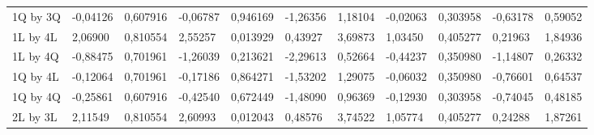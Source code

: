 \begin{table}[H]
{\begin{tabular}{lllllllllll}
\rowcolor[HTML]{FFFFFF} 
{\color[HTML]{000000} 1Q by 3Q}       & {\color[HTML]{000000} -0,04126} & {\color[HTML]{000000} 0,607916} & {\color[HTML]{000000} -0,06787} & {\color[HTML]{000000} 0,946169} & {\color[HTML]{000000} -1,26356}       & {\color[HTML]{000000} 1,18104}        & {\color[HTML]{000000} -0,02063} & {\color[HTML]{000000} 0,303958}      & {\color[HTML]{000000} -0,63178}       & {\color[HTML]{000000} 0,59052}        \\
\rowcolor[HTML]{FFFFFF} 
{\color[HTML]{000000} 1L by 4L}       & {\color[HTML]{FF0000} 2,06900}  & {\color[HTML]{FF0000} 0,810554} & {\color[HTML]{FF0000} 2,55257}  & {\color[HTML]{FF0000} 0,013929} & {\color[HTML]{FF0000} 0,43927}        & {\color[HTML]{FF0000} 3,69873}        & {\color[HTML]{FF0000} 1,03450}  & {\color[HTML]{FF0000} 0,405277}      & {\color[HTML]{FF0000} 0,21963}        & {\color[HTML]{FF0000} 1,84936}        \\
\rowcolor[HTML]{FFFFFF} 
{\color[HTML]{000000} 1L by 4Q}       & {\color[HTML]{000000} -0,88475} & {\color[HTML]{000000} 0,701961} & {\color[HTML]{000000} -1,26039} & {\color[HTML]{000000} 0,213621} & {\color[HTML]{000000} -2,29613}       & {\color[HTML]{000000} 0,52664}        & {\color[HTML]{000000} -0,44237} & {\color[HTML]{000000} 0,350980}      & {\color[HTML]{000000} -1,14807}       & {\color[HTML]{000000} 0,26332}        \\
\rowcolor[HTML]{FFFFFF} 
{\color[HTML]{000000} 1Q by 4L}       & {\color[HTML]{000000} -0,12064} & {\color[HTML]{000000} 0,701961} & {\color[HTML]{000000} -0,17186} & {\color[HTML]{000000} 0,864271} & {\color[HTML]{000000} -1,53202}       & {\color[HTML]{000000} 1,29075}        & {\color[HTML]{000000} -0,06032} & {\color[HTML]{000000} 0,350980}      & {\color[HTML]{000000} -0,76601}       & {\color[HTML]{000000} 0,64537}        \\
\rowcolor[HTML]{FFFFFF} 
{\color[HTML]{000000} 1Q by 4Q}       & {\color[HTML]{000000} -0,25861} & {\color[HTML]{000000} 0,607916} & {\color[HTML]{000000} -0,42540} & {\color[HTML]{000000} 0,672449} & {\color[HTML]{000000} -1,48090}       & {\color[HTML]{000000} 0,96369}        & {\color[HTML]{000000} -0,12930} & {\color[HTML]{000000} 0,303958}      & {\color[HTML]{000000} -0,74045}       & {\color[HTML]{000000} 0,48185}        \\
\rowcolor[HTML]{FFFFFF} 
{\color[HTML]{000000} 2L by 3L}       & {\color[HTML]{FF0000} 2,11549}  & {\color[HTML]{FF0000} 0,810554} & {\color[HTML]{FF0000} 2,60993}  & {\color[HTML]{FF0000} 0,012043} & {\color[HTML]{FF0000} 0,48576}        & {\color[HTML]{FF0000} 3,74522}        & {\color[HTML]{FF0000} 1,05774}  & {\color[HTML]{FF0000} 0,405277}      & {\color[HTML]{FF0000} 0,24288}        & {\color[HTML]{FF0000} 1,87261}        \\

\end{tabular}}
\end{table}

